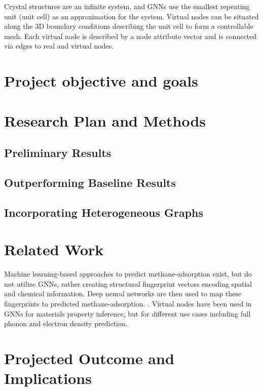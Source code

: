 \documentclass{lxaiproposal}
\begin{document}
Crystal structures are an infinite system, and GNNs use the smallest repeating unit (unit cell) as an approximation for the system. Virtual nodes can be situated along the 3D boundary conditions describing the unit cell to form a controllable mesh. Each virtual node is described by a node attribute vector and is connected via edges to real and virtual nodes.

\section*{Project objective and goals}

\section*{Research Plan and Methods}

\subsection{Preliminary Results}

\subsection{Outperforming Baseline Results}

\subsection{Incorporating Heterogeneous Graphs}

\section*{Related Work}

Machine learning-based approaches to predict methane-adsorption exist, but do not utilize GNNs, rather creating structural fingerprint vectors encoding spatial and chemical information. Deep neural networks are then used to map these fingerprints to predicted methane-adsorption. \cite{gurnani2021interpretable}. 
Virtual nodes have been used in GNNs for materials property inference, but for different use cases including full phonon\cite{https://doi.org/10.48550/arxiv.2010.09435} and electron density prediction\cite{jorgensen2022equivariant}.

\section*{Projected Outcome and Implications}
\end{document}
